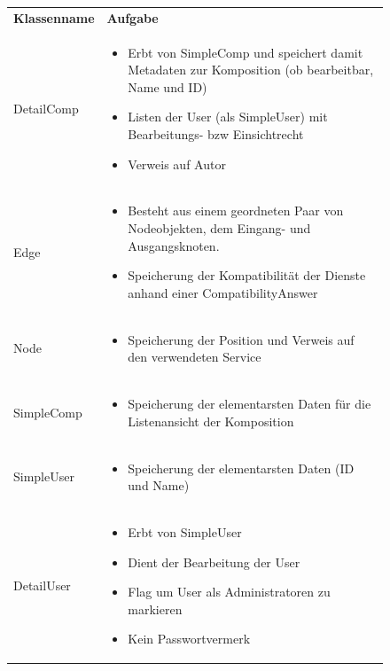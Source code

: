 \begin{figure}[h]
	\begin{tabularx}{\textwidth}{p{} | X}
		\rowcolor[HTML]{C0C0C0}
		\textbf{Klassenname} & \textbf{Aufgabe} \\
		DetailComp & \compress \begin{itemize}
			\item Erbt von SimpleComp und speichert damit Metadaten zur Komposition (ob bearbeitbar, Name und ID)
			\item Listen der User (als SimpleUser) mit Bearbeitungs- bzw Einsichtrecht
			\item Verweis auf Autor
		\end{itemize}\\
		\rowcolor[HTML]{E7E7E7}
		Edge & \compress \begin{itemize}
		  \item Besteht aus einem geordneten Paar von Nodeobjekten, dem Eingang- und Ausgangsknoten.
			\item Speicherung der Kompatibilität der Dienste anhand einer CompatibilityAnswer
		\end{itemize}\\
		Node & \compress \begin{itemize}
			\item Speicherung der Position und Verweis auf den verwendeten Service
		\end{itemize}\\
		\rowcolor[HTML]{E7E7E7}
		SimpleComp & \compress \begin{itemize}
			\item Speicherung der elementarsten Daten für die Listenansicht der Komposition
		\end{itemize}\\
		SimpleUser  & \compress \begin{itemize}
			\item Speicherung der elementarsten Daten (ID und Name)
		\end{itemize}\\
		\rowcolor[HTML]{E7E7E7}
		DetailUser & \compress \begin{itemize}
			\item Erbt von SimpleUser
			\item Dient der Bearbeitung der User
			\item Flag um User als Administratoren zu markieren
			\item Kein Passwortvermerk
		\end{itemize}\\

\end{tabularx}
\end{figure}
